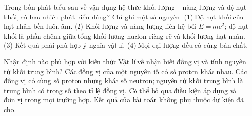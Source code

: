 \begin{ex}
Trong bốn phát biểu sau về vận dụng hệ thức khối lượng – năng lượng và độ hụt khối, có bao nhiêu phát biểu đúng? Chỉ ghi một số nguyên. (1) Độ hụt khối của hạt nhân bền luôn âm. (2) Khối lượng và năng lượng liên hệ bởi $E=mc^2$; độ hụt khối là phần chênh giữa tổng khối lượng nuclon riêng rẽ và khối lượng hạt nhân. (3) Kết quả phải phù hợp ý nghĩa vật lí. (4) Mọi đại lượng đều có cùng bản chất.
\end{ex}

\begin{ex}
Nhận định nào phù hợp với kiến thức Vật lí về nhận biết đồng vị và tính nguyên tử khối trung bình?
\choice
{Các đồng vị của một nguyên tố có số proton khác nhau.}
{\True Các đồng vị có cùng số proton nhưng khác số neutron; nguyên tử khối trung bình là trung bình có trọng số theo tỉ lệ đồng vị.}
{Có thể bỏ qua điều kiện áp dụng và đơn vị trong mọi trường hợp.}
{Kết quả của bài toán không phụ thuộc dữ kiện đã cho.}
\end{ex}

